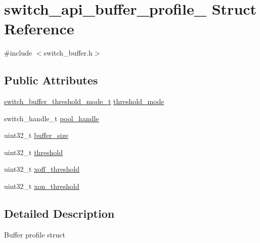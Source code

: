 \hypertarget{structswitch__api__buffer__profile__}{\section{switch\+\_\+api\+\_\+buffer\+\_\+profile\+\_\+ Struct Reference}
\label{structswitch__api__buffer__profile__}
}


{\ttfamily \#include $<$switch\+\_\+buffer.\+h$>$}

\subsection*{Public Attributes}
\begin{DoxyCompactItemize}
\item 
\hyperlink{group__Buffer_gad5d808c4c42a170d1afae11767fddeff}{switch\+\_\+buffer\+\_\+threshold\+\_\+mode\+\_\+t} \hyperlink{structswitch__api__buffer__profile___ab876eda68dfaa120a37984932f7361b5}{threshold\+\_\+mode}
\item 
switch\+\_\+handle\+\_\+t \hyperlink{structswitch__api__buffer__profile___af85c1725eb93f9affdb5f93f2e3983d1}{pool\+\_\+handle}
\item 
uint32\+\_\+t \hyperlink{structswitch__api__buffer__profile___ad38ecbf7befbbc6bdcaf5aef3c6445cd}{buffer\+\_\+size}
\item 
uint32\+\_\+t \hyperlink{structswitch__api__buffer__profile___afae5b29b104cc13d690bb2a2914c415f}{threshold}
\item 
uint32\+\_\+t \hyperlink{structswitch__api__buffer__profile___a5197456217ebf7695de96336d7cc15e9}{xoff\+\_\+threshold}
\item 
uint32\+\_\+t \hyperlink{structswitch__api__buffer__profile___a4a850a5574babf80d0433acbba5928ac}{xon\+\_\+threshold}
\end{DoxyCompactItemize}


\subsection{Detailed Description}
Buffer profile struct 

